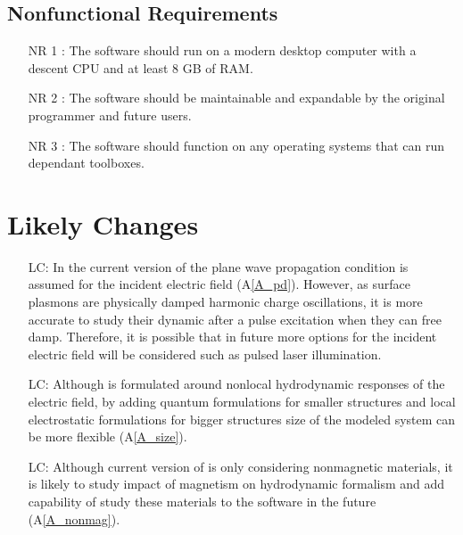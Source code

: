 \documentclass[12pt]{article}
\newcounter{lcnum} %
\begin{document}
	\subsection{Nonfunctional Requirements}
	
	\begin{itemize}
		
		\item[NR 1 \label{NR_RAM}:] The software should run on a modern desktop
		computer with a descent CPU and at least 8 GB of RAM.
		
		\item[NR 2 \label{R_update}:] The software should be maintainable and
		expandable by the original programmer and future users.
		
		\item[NR 3 \label{R_compatibility}:] The software should function on any
		operating systems that can run dependant toolboxes. \end{itemize}
	
	
	\section{Likely Changes}
	
	\noindent \begin{itemize}
		
		\item[LC\refstepcounter{lcnum}\thelcnum\label{LC_lightsource}:] In the current
		version of the \progname{} plane wave propagation condition is assumed for the
		incident electric field (A\ref{A_pd}). However, as surface plasmons are
		physically damped harmonic charge oscillations, it is more accurate to study
		their dynamic after a pulse excitation when they can free damp. Therefore, it
		is possible that in future more options for the incident electric field will
		be considered such as pulsed laser illumination.
		
		\item[LC\refstepcounter{lcnum}\thelcnum\label{LC_size}:] Although \progname{}
		is formulated around nonlocal hydrodynamic responses of the electric field, by
		adding quantum formulations for smaller structures and local electrostatic
		formulations for bigger structures size of the modeled system can be more
		flexible (A\ref{A_size}).
		
		
		\item[LC\refstepcounter{lcnum}\thelcnum\label{LC_magnetism}:] Although current
		version of \progname{} is only considering nonmagnetic materials, it is likely
		to study impact of magnetism on hydrodynamic formalism and add capability of
		study these materials to the software in the future (A\ref{A_nonmag}).
		
	\end{itemize}
	
\end{document}
